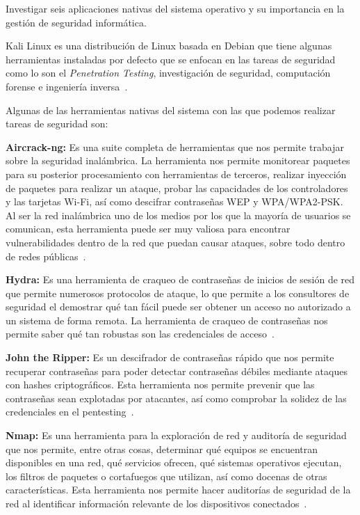 Investigar seis aplicaciones nativas del sistema operativo y su importancia en la gestión de seguridad informática.

Kali Linux es una distribución de Linux basada en Debian que tiene algunas herramientas instaladas por defecto que se enfocan en las tareas de seguridad como lo son el \textit{Penetration Testing}, investigación de seguridad, computación forense e ingeniería inversa~\cite{kali_docs}.

Algunas de las herramientas nativas del sistema con las que podemos realizar tareas de seguridad son:
\begin{itemizeColor}
    \item \textbf{Aircrack-ng:} Es una suite completa de herramientas que nos permite trabajar sobre la seguridad inalámbrica. La herramienta nos permite monitorear paquetes para su posterior procesamiento con herramientas de terceros, realizar inyección de paquetes para realizar un ataque, probar las capacidades de los controladores y las tarjetas Wi-Fi, así como descifrar contraseñas WEP y WPA/WPA2-PSK. Al ser la red inalámbrica uno de los medios por los que la mayoría de usuarios se comunican, esta herramienta puede ser muy valiosa para encontrar vulnerabilidades dentro de la red que puedan causar ataques, sobre todo dentro de redes públicas~\cite{aircrack_ng_docs}.
    \item \textbf{Hydra:} Es una herramienta de craqueo de contraseñas de inicios de sesión de red que permite numerosos protocolos de ataque, lo que permite a los consultores de seguridad el demostrar qué tan fácil puede ser obtener un acceso no autorizado a un sistema de forma remota. La herramienta de craqueo de contraseñas nos permite saber qué tan robustas son las credenciales de acceso~\cite{hydra_github}.
    \item \textbf{John the Ripper:} Es un descifrador de contraseñas rápido que nos permite recuperar contraseñas para poder detectar contraseñas débiles mediante ataques con hashes criptográficos. Esta herramienta nos permite prevenir que las contraseñas sean explotadas por atacantes, así como comprobar la solidez de las credenciales en el pentesting~\cite{john}.
    \item \textbf{Nmap:} Es una herramienta para la exploración de red y auditoría de seguridad que nos permite, entre otras cosas, determinar qué equipos se encuentran disponibles en una red, qué servicios ofrecen, qué sistemas operativos ejecutan, los filtros de paquetes o cortafuegos que utilizan, así como docenas de otras características. Esta herramienta nos permite hacer auditorías de seguridad de la red al identificar información relevante de los dispositivos conectados~\cite{nmap}.

\end{itemizeColor}
